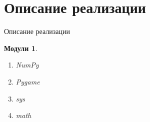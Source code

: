 \documentclass[handout]{beamer}
\newtheorem*{modules}{Модули}
\begin{document}
	
	\section{Описание реализации}
	\begin{frame}{Описание реализации}

	\begin{modules}
		\begin{enumerate}
		 \item NumPy
		 \item Pygame
		 \item sys
		 \item math
		\end{enumerate}
	\end{modules}

	\end{frame}
\end{document}
